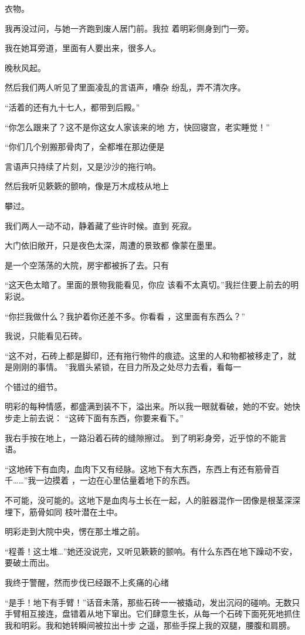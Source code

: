 \documentclass{article}
\begin{document}
\newpage
衣物。 

我再没过问，与她一齐跑到废人居门前。我拉
着明彩侧身到门一旁。 


我在她耳旁道，里面有人要出来，很多人。 


晚秋风起。 

然后我们两人听见了里面凌乱的言语声，嘈杂
纷乱，弄不清次序。 


“活着的还有九十七人，都带到后殿。” 

“你怎么跟来了？这不是你这女人家该来的地
方，快回寝宫，老实睡觉！” 

“你们几个别搬那骨肉了，全都堆在那边便是


言语声只持续了片刻，又是沙沙的拖行响。 

然后我听见簌簌的颤响，像是万木成枝从地上
\newpage

攀过。 

我们两人一动不动，静着藏了些许时候。直到
死寂。 

大门依旧敞开，只是夜色太深，周遭的景致都
像蒙在墨里。 

是一个空荡荡的大院，房宇都被拆了去。只有

“这天色太暗了。里面的景物我能看见，你应
该看不太真切。”我拦住要上前去的明彩说。 

“你拦我做什么？我护着你还差不多。你看看
，这里面有东西么？” 


我说，只能看见石砖。 

“这不对，石砖上都是脚印，还有拖行物件的痕迹。这里的人和物都被移走了，就是刚刚的事情。 ”我眉头紧锁，在目力所及之处尽力去看，看每一
\newpage

个错过的细节。 

明彩的每种情感，都盛满到装不下，溢出来。所以我一眼就看破，她的不安。她快步走上前去说：
“这砖下面有东西，你要来看下。” 

我右手按在地上，一路沿着石砖的缝隙擦过。
到了明彩身旁，近乎惊的不能言语。 

“这地砖下有血肉，血肉下又有经脉。这地下有大东西，东西上有还有筋骨百千……”我一边摸着
，一边在心里估量着地下的东西。 

不可能，没可能的。这地下是血肉与土长在一起，人的脏器混作一团像是根茎深深埋下，筋骨如同
枝叶潜在土中。 


明彩走到大院中央，愣在那土堆之前。 

“程善！这土堆…”她还没说完，又听见簌簌的颤响。有什么东西在地下躁动不安，要破土而出。
\newpage


我终于警醒，然而步伐已经跟不上炙痛的心绪

“是手！地下有手臂！”话音未落，那些石砖一一被撬动，发出沉闷的碰响。无数只手臂相互接连，盘错着从地下窜出。它们肆意生长，从每一个石砖下面死死地抓住我和明彩。我和她转瞬间被拉出十步
之遥，那些手探上我的双腿，腰腹和肩膀。 
\end{document}
